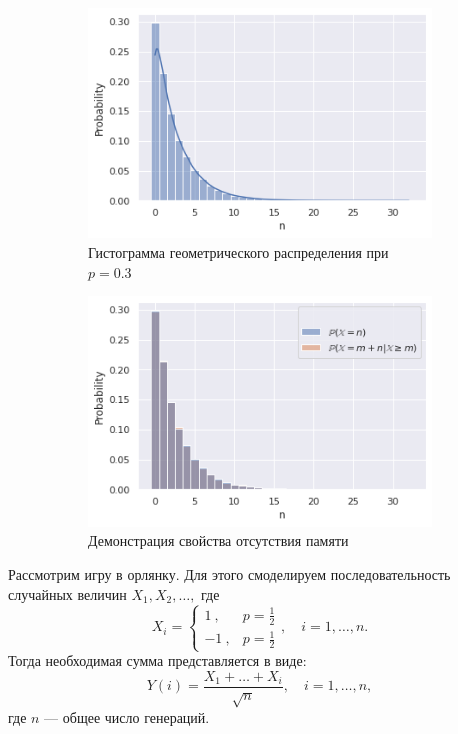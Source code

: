  \begin{figure}
     \centering
     \begin{subfigure}[b]{0.45\textwidth}
         \centering
         \includegraphics[width=\textwidth]{./resources/geometric.png}
         \caption{Гистограмма геометрического распределения при $p = 0.3$}
         \label{subfig:geometric_distribution}
     \end{subfigure}
     \hfill
     \begin{subfigure}[b]{0.45\textwidth}
         \centering
         \includegraphics[width=\textwidth]{./resources/comparison.png}
         \caption{Демонстрация свойства отсутствия памяти}
         \label{subfig:memoryless}
     \end{subfigure}
     \caption{}
     \label{fig:geometric}
\end{figure}

Рассмотрим игру в орлянку. Для этого смоделируем последовательность
 случайных величин $X_1, X_2, \dots,$ где
$$
	X_i = 
	\begin{cases}
	     1 \ , & p = \frac{1}{2}\\
	     -1 \ , & p = \frac{1}{2}
	\end{cases}
     ,\quad i = 1,\dots,n.
$$
Тогда необходимая сумма представляется в виде:
$$
Y(i) = \dfrac{X_1 + \dots + X_i}{\sqrt n}, \quad
 i = 1,\dots,n ,
$$
где $n$ --- общее число генераций.

